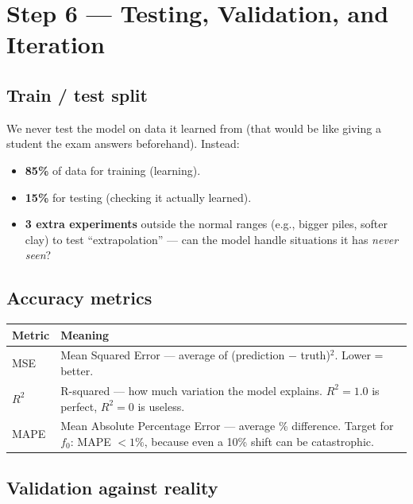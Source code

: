 \documentclass[11pt,a4paper]{article}
\begin{document}
\section{Step 6 --- Testing, Validation, and Iteration}
\label{sec:testing}

\subsection{Train / test split}

We never test the model on data it learned from (that would be like giving a
student the exam answers beforehand).  Instead:
\begin{itemize}[noitemsep]
  \item \textbf{85\%} of data for training (learning).
  \item \textbf{15\%} for testing (checking it actually learned).
  \item \textbf{3 extra experiments} outside the normal ranges (e.g., bigger
        piles, softer clay) to test ``extrapolation'' --- can the model handle
        situations it has \textit{never seen}?
\end{itemize}

\subsection{Accuracy metrics}

\begin{center}
\begin{tabular}{lp{8.5cm}}
\toprule
\textbf{Metric} & \textbf{Meaning} \\
\midrule
MSE &
  Mean Squared Error --- average of (prediction $-$ truth)$^2$.
  Lower = better. \\[3pt]
$R^2$ &
  R-squared --- how much variation the model explains.
  $R^2 = 1.0$ is perfect, $R^2 = 0$ is useless. \\[3pt]
MAPE &
  Mean Absolute Percentage Error --- average \% difference.
  Target for $f_0$: MAPE $< 1\%$, because even a 10\% shift can be
  catastrophic. \\
\bottomrule
\end{tabular}
\end{center}

\subsection{Validation against reality}
\end{document}

